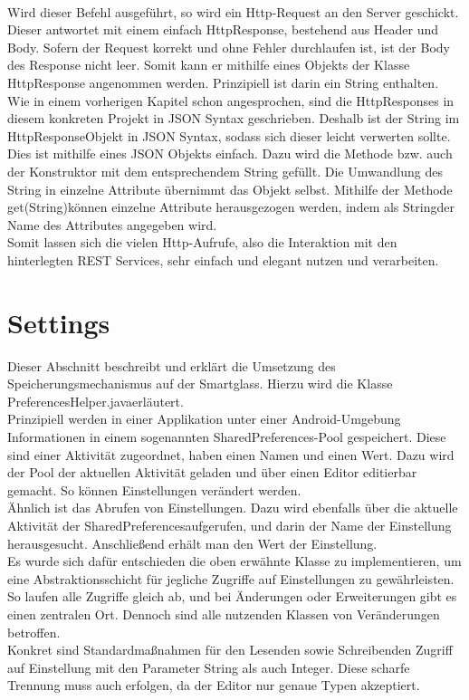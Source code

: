 \\
Wird dieser Befehl ausgeführt, so wird ein Http-Request an den Server geschickt. Dieser antwortet mit einem einfach HttpResponse, bestehend aus Header und Body. Sofern der Request korrekt und ohne Fehler durchlaufen ist, ist der Body des Response nicht leer. Somit kann er mithilfe eines Objekts der Klasse HttpResponse angenommen werden. Prinzipiell ist darin ein String enthalten. 
\\
Wie in einem vorherigen Kapitel schon angesprochen, sind die HttpResponses in diesem konkreten Projekt in JSON Syntax geschrieben. Deshalb ist der String im \glqq HttpResponse\grqq Objekt in JSON Syntax, sodass sich dieser leicht verwerten sollte. Dies ist mithilfe eines JSON Objekts einfach. Dazu wird die Methode bzw. auch der Konstruktor mit dem entsprechendem String gefüllt. Die Umwandlung des String in einzelne Attribute übernimmt das Objekt selbst. Mithilfe der Methode \glqq get(String)\grqq können einzelne Attribute herausgezogen werden, indem als \glqq String\grqq der Name des Attributes angegeben wird.
\\
Somit lassen sich die vielen Http-Aufrufe, also die Interaktion mit den hinterlegten REST Services, sehr einfach und elegant nutzen und verarbeiten.

\section{Settings}
\label{sec:settings}
Dieser Abschnitt beschreibt und erklärt die Umsetzung des Speicherungsmechanismus auf der Smartglass. Hierzu wird die Klasse \glqq PreferencesHelper.java\grqq erläutert. 
\\
Prinzipiell werden in einer Applikation unter einer Android-Umgebung Informationen in einem sogenannten SharedPreferences-Pool gespeichert. Diese sind einer Aktivität zugeordnet, haben einen Namen und einen Wert. Dazu wird der Pool der aktuellen Aktivität geladen und über einen Editor editierbar gemacht. So können Einstellungen verändert werden. 
\\
Ähnlich ist das Abrufen von Einstellungen. Dazu wird ebenfalls über die aktuelle Aktivität der \glqq SharedPreferences\grqq aufgerufen, und darin der Name der Einstellung herausgesucht. Anschließend erhält man den Wert der Einstellung. 
\\
Es wurde sich dafür entschieden die oben erwähnte Klasse zu implementieren, um eine Abstraktionsschicht für jegliche Zugriffe auf Einstellungen zu gewährleisten. So laufen alle Zugriffe gleich ab, und bei Änderungen oder Erweiterungen gibt es einen zentralen Ort. Dennoch sind alle nutzenden Klassen von Veränderungen betroffen. 
\\
Konkret sind Standardmaßnahmen für den Lesenden sowie Schreibenden Zugriff auf Einstellung mit den Parameter String als auch Integer. Diese scharfe Trennung muss auch erfolgen, da der Editor nur genaue Typen akzeptiert. 



